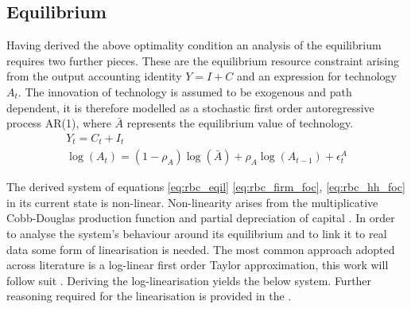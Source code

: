 \documentclass[12pt,a4paper,english]{article} %
\begin{document}
	\subsection{Equilibrium}
	Having derived the above optimality condition an analysis of the equilibrium requires two further pieces. These are the equilibrium resource constraint arising from the output accounting identity $Y = I + C$ and an expression for technology $A_t$. The innovation of technology is assumed to be exogenous and path dependent, it is therefore modelled as a stochastic first order autoregressive process AR(1), where $\bar{A}$ represents the equilibrium value of technology.
	\begin{equation} \label{eq:rbc_eqil}
		\begin{aligned}
			Y_t = C_t + I_t \\
			\log(A_t) = (1- \rho_A) \log(\bar{A}) + \rho_A \log(A_{t-1}) + \epsilon_t^A
		\end{aligned}
	\end{equation}

	The derived system of equations \eqref{eq:rbc_eqil} \eqref{eq:rbc_firm_foc}, \eqref{eq:rbc_hh_foc} in its current state is non-linear. Non-linearity arises from the multiplicative Cobb-Douglas production function and partial depreciation of capital \cite{campbell_inspecting_1994}. In order to analyse the system's behaviour around its equilibrium and to link it to real data some form of linearisation is needed. The most common approach adopted across literature is a log-linear first order Taylor approximation, this work will follow suit \cite{campbell_inspecting_1994}. Deriving the log-linearisation yields the below system. Further reasoning required for the linearisation is provided in the .
	 
\end{document}
